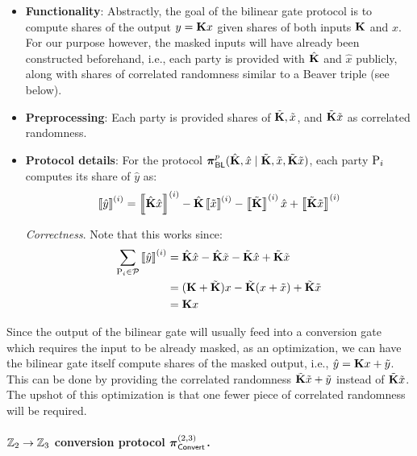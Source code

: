 \begin{itemize}
  \item \textbf{Functionality}: 
  Abstractly, the goal of the bilinear gate protocol is to compute shares of the output $y = \mat{K}x$ given shares of both inputs $\mat{K}$ and $x$. For our purpose however, the masked inputs will have already been constructed beforehand, i.e., each party is provided with $\hat{\mat{K}}$ and $\hat{x}$ publicly, along with shares of correlated randomness similar to a Beaver triple (see below).

  \item \textbf{Preprocessing}: Each party is provided shares of $\tilde{\mat{K}}, \tilde{x}$, and $\tilde{\mat{K}}\tilde{x}$ as correlated randomness.

  \item \textbf{Protocol details}: For the protocol $\prot_\BLMap^p(\hat{\mat{K}},\hat{x}\mid \tilde{\mat{K}}, \tilde{x}, \tilde{\mat{K}}\tilde{x})$, each party $\textnormal{P}_i$ computes its share of $\hat{y}$ as:
  \[
    \sharei{\hat{y}} = \sharei{\hat{\mat{K}}\hat{x}} - \hat{\mat{K}}\sharei{\tilde{x}} - \sharei{\tilde{\mat{K}}}\hat{x} + \sharei{\tilde{\mat{K}}\tilde{x}}
  \]

  \noindent \textit{Correctness}. Note that this works since:
  \begin{align*}
  \sum_{\party_i \in \parties} \sharei{\hat{y}} &= \hat{\mat{K}}\hat{x} - \hat{\mat{K}}\tilde{x} - \tilde{\mat{K}}\hat{x} + \tilde{\mat{K}}\tilde{x} \\
  &= (\mat{K} + \tilde{\mat{K}})x - \tilde{\mat{K}}(x + \tilde{x}) + \tilde{\mat{K}}\tilde{x} \\
  &= \mat{K}x
  \end{align*}
\end{itemize}
Since the output of the bilinear gate will usually feed into a conversion gate which requires the input to be already masked, as an optimization, we can have the bilinear gate itself compute shares of the masked output, i.e., $\hat{y} = \mat{K}x + \tilde{y}$. This can be done by providing the correlated randomness $\tilde{\mat{K}}\tilde{x} + \tilde{y}$ instead of $\tilde{\mat{K}}\tilde{x}$. The upshot of this optimization is that one fewer piece of correlated randomness will be required.

\paragraph{$\mathbb{Z}_2 \to \mathbb{Z}_3$ conversion protocol $\boldsymbol{\pi}_{\textnormal{\textsf{Convert}}}^{(2,3)}$.}

